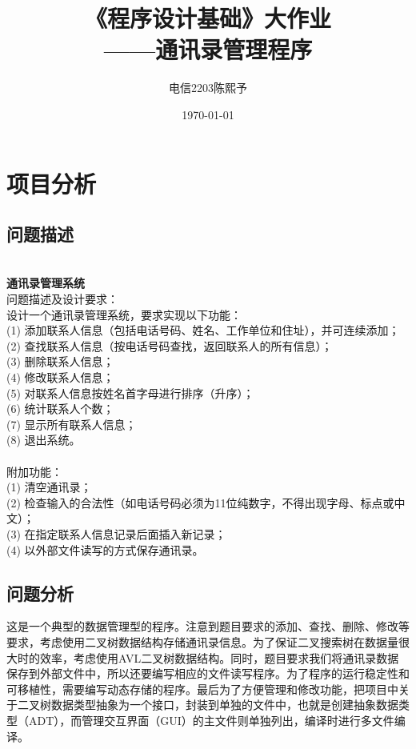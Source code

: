\documentclass[12pt, a4paper, oneside]{ctexart}
\title{\textbf{《程序设计基础》大作业\\ ——通讯录管理程序}}
\author{电信2203\qquad 陈熙予\qquad 2224512913}
\date{\today}
\newenvironment{problem*}
    {\begin{shaded}\par\noindent}{\end{shaded}\par}
\begin{document}
\maketitle

\section{项目分析}
\subsection{问题描述}
\begin{problem*}
    \\ \textbf{通讯录管理系统} \\
    问题描述及设计要求：\\
    设计一个通讯录管理系统，要求实现以下功能：\\
    (1) 添加联系人信息（包括电话号码、姓名、工作单位和住址），并可连续添加；\\
    (2) 查找联系人信息（按电话号码查找，返回联系人的所有信息）；\\
    (3) 删除联系人信息；\\
    (4) 修改联系人信息；\\
    (5) 对联系人信息按姓名首字母进行排序（升序）；\\
    (6) 统计联系人个数；\\
    (7) 显示所有联系人信息；\\
    (8) 退出系统。\\ \\
    附加功能：\\
    (1) 清空通讯录；\\
    (2) 检查输入的合法性（如电话号码必须为11位纯数字，不得出现字母、标点或中文）；\\
    (3) 在指定联系人信息记录后面插入新记录；\\
    (4) 以外部文件读写的方式保存通讯录。
\end{problem*}
\subsection{问题分析}
这是一个典型的数据管理型的程序。注意到题目要求的添加、查找、删除、修改等要求，考虑使用二叉树数据结构存储通讯录信息。为了保证二叉搜索树在数据量很大时的效率，考虑使用AVL二叉树数据结构。同时，题目要求我们将通讯录数据保存到外部文件中，所以还要编写相应的文件读写程序。为了程序的运行稳定性和可移植性，需要编写动态存储的程序。最后为了方便管理和修改功能，把项目中关于二叉树数据类型抽象为一个接口，封装到单独的文件中，也就是创建抽象数据类型（ADT），而管理交互界面（GUI）的主文件则单独列出，编译时进行多文件编译。
\end{document}
